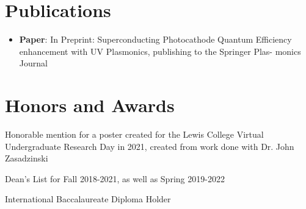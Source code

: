 \documentclass[a4paper,20pt]{article}
\newcommand{\resumeItem}[2]{
  \item\small{
    \textbf{#1}{: #2 \vspace{-2pt}}
  }
}
\newcommand{\resumeSubItem}[2]{\resumeItem{#1}{#2}\vspace{-3pt}}
\newcommand{\resumeSubHeadingListStart}{\begin{itemize}[leftmargin=*]}
\newcommand{\resumeSubHeadingListEnd}{\end{itemize}}
\begin{document}
\section{Publications}
\resumeSubHeadingListStart
\resumeSubItem{Paper}{In Preprint: Superconducting Photocathode Quantum Efficiency enhancement with UV Plasmonics, publishing to the Springer Plas- monics Journal}
\resumeSubHeadingListEnd
\vspace{-5pt}
\section{Honors and Awards}
\begin{description}[font=$\bullet$]
\item {Honorable mention for a poster created for the Lewis College Virtual Undergraduate Research Day in 2021, created from work done with Dr. John Zasadzinski}
\vspace{-5pt}
\item {Dean's List for Fall 2018-2021, as well as Spring 2019-2022}
\vspace{-5pt}
\item {International Baccalaureate Diploma Holder}
\end{description}
\end{document}
